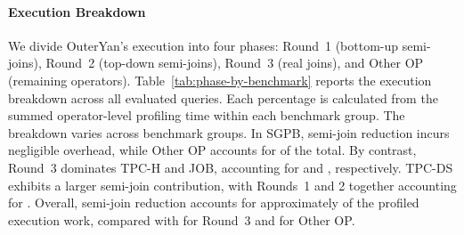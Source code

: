 

\paragraph{Execution Breakdown}
\label{sec:phase-breakdown}

We divide OuterYan's execution into four phases: Round~1 (bottom-up semi-joins), Round~2 (top-down semi-joins), Round~3 (real joins), and Other OP (remaining operators). Table~\ref{tab:phase-by-benchmark} reports the execution breakdown across all  evaluated queries. Each percentage is calculated from the summed operator-level profiling time within each benchmark group. The breakdown varies across benchmark groups. In SGPB, semi-join reduction incurs negligible overhead, while Other OP accounts for  of the total. By contrast, Round~3 dominates TPC-H and JOB, accounting for  and , respectively. TPC-DS exhibits a larger semi-join contribution, with Rounds~1 and 2 together accounting for . Overall, semi-join reduction accounts for approximately  of the profiled execution work, compared with  for Round~3 and  for Other OP.

